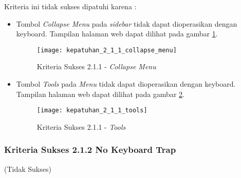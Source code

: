 Kriteria ini tidak sukses dipatuhi karena :
\begin{itemize}
	\item Tombol \textit{Collapse Menu} pada \textit{sidebar} tidak dapat dioperasikan dengan keyboard. Tampilan halaman web dapat dilihat pada gambar \ref{fig:kepatuhan_2_1_1_collapse_menu}.
	\begin{figure}[H]
		\centering  
		\texttt{[image: kepatuhan\_2\_1\_1\_collapse\_menu]}  
		\caption[Kriteria Sukses 2.1.1 - \textit{Collapse Menu}]{Kriteria Sukses 2.1.1 - \textit{Collapse Menu}} 
		\label{fig:kepatuhan_2_1_1_collapse_menu} 
	\end{figure}

	\item Tombol \textit{Tools} pada \textit{Menu} tidak dapat dioperasikan dengan keyboard. Tampilan halaman web dapat dilihat pada gambar \ref{fig:kepatuhan_2_1_1_tools}.
	\begin{figure}[H]
		\centering  
		\texttt{[image: kepatuhan\_2\_1\_1\_tools]}  
		\caption[Kriteria Sukses 2.1.1 - \textit{Tools}]{Kriteria Sukses 2.1.1 - \textit{Tools}} 
		\label{fig:kepatuhan_2_1_1_tools} 
	\end{figure}

\end{itemize}

\subsubsection{Kriteria Sukses 2.1.2 No Keyboard Trap}
\label{subsubsec:kepatuhan_kriteria_2.1.2}
(Tidak Sukses) \\

